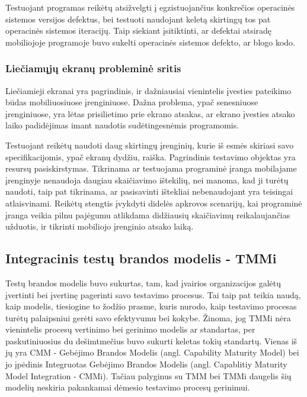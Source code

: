 \documentclass{VUMIFPSkursinis}
\begin{document}
Testuojant programas reikėtų atsižvelgti į egzistuojančius konkrečios operacinės sistemos versijos defektus, bei testuoti naudojant keletą skirtingų tos pat operacinės sistemos iteracijų. Taip siekiant įsitiktinti, ar defektai atsiradę mobiliojoje programoje buvo sukelti operacinės sistemos defekto, ar blogo kodo.

\subsubsection{Liečiamųjų ekranų probleminė sritis}
Liečiamieji ekranai yra pagrindinis, ir dažniausiai vienintelis įvesties pateikimo būdas mobiliuosiuose įrenginiuose. Dažna problema, ypač senesniuose įrenginiuose, yra lėtas prisilietimo prie ekrano atsakas, ar ekrano įvesties atsako laiko padidėjimas imant naudotis sudėtingesnėmis programomis.

Testuojant reikėtų naudoti daug skirtingų įrenginių, kurie iš esmės skiriasi savo specifikacijomis, ypač ekranų dydžiu, raiška. Pagrindinis testavimo objektas yra resursų pasiskirstymas. Tikrinama ar testuojama programinė įranga mobilajame įrenginyje nenaudoja daugiau skaičiavimo ištekilių, nei manoma, kad ji turėtų naudoti, taip pat tikrinama, ar pasisavinti ištekliai nebenaudojant yra teisingai atlaisvinami. Reikėtų stengtis įvykdyti didelės apkrovos scenarijų, kai programinė įranga veikia pilnu pajėgumu atlikdama didžiausių skaičiavimų reikalaujančias užduotis, ir tikrinti mobiliojo įrenginio atsako laiką.

\subsection{Integracinis testų brandos modelis - TMMi}
Testų brandos modelis buvo sukurtas, tam, kad įvairios organizacijos galėtų įvertinti bei įvertinę pagerinti savo testavimo procesus. Tai taip pat teikia naudą, kaip modelis, tiesiogine to žodžio prasme, kuris nurodo, kaip testavimo procesas turėtų  palaipsniui gerėti savo efektyvumu bei kokybe. \cite{Burnstein:2010:PST:1965566} Žinoma, jog TMMi nėra vienintelis procesų vertinimo bei gerinimo modelis ar standartas, per paskutiniuosius du dešimtmečius buvo sukurti keletas tokių standartų. Vienas iš jų yra CMM - Gebėjimo Brandos Modelis (angl. Capability Maturity Model) bei jo įpėdinis Integruotas Gebėjimo Brandos Modelis (angl. Capablitiy Maturity Model Integration - CMMi). Tačiau palyginus su TMM bei TMMi daugelis šių modelių neskiria pakankamai dėmesio testavimo procesų gerinimui. 
\end{document}
